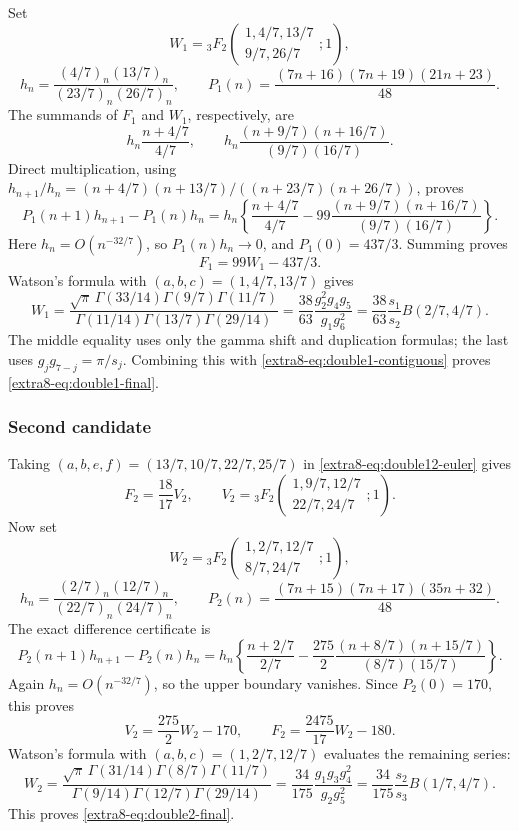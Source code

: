 \documentclass[11pt,a4paper]{article}
\theoremstyle{definition}
\theoremstyle{remark}
\numberwithin{equation}{section}
\begin{document}
Set
\[
 W_1={}_3F_2\left(\begin{matrix}1,4/7,13/7\\9/7,26/7\end{matrix};1\right),
\]
\[
 h_n=\frac{(4/7)_n(13/7)_n}{(23/7)_n(26/7)_n},\qquad
 P_1(n)=\frac{(7n+16)(7n+19)(21n+23)}{48}.
\]
The summands of $F_1$ and $W_1$, respectively, are
\[
 h_n\frac{n+4/7}{4/7},\qquad
 h_n\frac{(n+9/7)(n+16/7)}{(9/7)(16/7)}.
\]
Direct multiplication, using
$h_{n+1}/h_n=(n+4/7)(n+13/7)/((n+23/7)(n+26/7))$, proves
\begin{equation}\label{extra8-eq:double1-certificate}
 P_1(n+1)h_{n+1}-P_1(n)h_n
 =h_n\left\{\frac{n+4/7}{4/7}
   -99\frac{(n+9/7)(n+16/7)}{(9/7)(16/7)}\right\}.
\end{equation}
Here $h_n=O(n^{-32/7})$, so $P_1(n)h_n\to0$, and
$P_1(0)=437/3$.  Summing proves
\begin{equation}\label{extra8-eq:double1-contiguous}
 F_1=99W_1-437/3.
\end{equation}
Watson's formula with $(a,b,c)=(1,4/7,13/7)$ gives
\[
 W_1=
 \frac{\sqrt\pi\,\Gamma(33/14)\Gamma(9/7)\Gamma(11/7)}
 {\Gamma(11/14)\Gamma(13/7)\Gamma(29/14)}
 =\frac{38}{63}\frac{g_2^2g_4g_5}{g_1g_6^2}
 =\frac{38}{63}\frac{s_1}{s_2}B(2/7,4/7).
\]
The middle equality uses only the gamma shift and duplication formulas;
the last uses $g_jg_{7-j}=\pi/s_j$.  Combining this with
\eqref{extra8-eq:double1-contiguous} proves \eqref{extra8-eq:double1-final}.

\subsubsection{Second candidate}

Taking $(a,b,e,f)=(13/7,10/7,22/7,25/7)$ in
\eqref{extra8-eq:double12-euler} gives
\[
 F_2=\frac{18}{17}V_2,\qquad
 V_2={}_3F_2\left(\begin{matrix}1,9/7,12/7\\22/7,24/7\end{matrix};1\right).
\]
Now set
\[
 W_2={}_3F_2\left(\begin{matrix}1,2/7,12/7\\8/7,24/7\end{matrix};1\right),
\]
\[
 h_n=\frac{(2/7)_n(12/7)_n}{(22/7)_n(24/7)_n},\qquad
 P_2(n)=\frac{(7n+15)(7n+17)(35n+32)}{48}.
\]
The exact difference certificate is
\begin{equation}\label{extra8-eq:double2-certificate}
 P_2(n+1)h_{n+1}-P_2(n)h_n
 =h_n\left\{\frac{n+2/7}{2/7}
  -\frac{275}{2}\frac{(n+8/7)(n+15/7)}{(8/7)(15/7)}\right\}.
\end{equation}
Again $h_n=O(n^{-32/7})$, so the upper boundary vanishes.
Since $P_2(0)=170$, this proves
\[
 V_2=\frac{275}{2}W_2-170,\qquad
 F_2=\frac{2475}{17}W_2-180.
\]
Watson's formula with $(a,b,c)=(1,2/7,12/7)$ evaluates the remaining
series:
\[
 W_2=
 \frac{\sqrt\pi\,\Gamma(31/14)\Gamma(8/7)\Gamma(11/7)}
 {\Gamma(9/14)\Gamma(12/7)\Gamma(29/14)}
 =\frac{34}{175}\frac{g_1g_3g_4^2}{g_2g_5^2}
 =\frac{34}{175}\frac{s_2}{s_3}B(1/7,4/7).
\]
This proves \eqref{extra8-eq:double2-final}.
\end{document}
